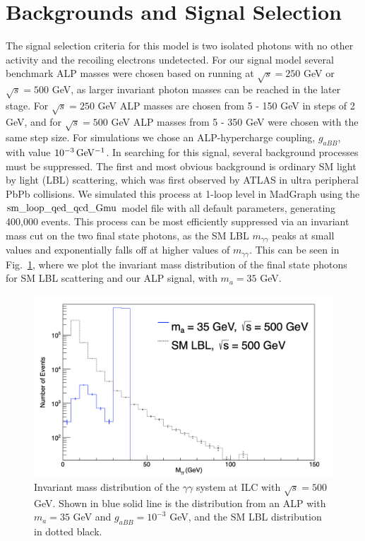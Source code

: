 \documentclass[aps,onecolumn,twoside,secnumarabic,12pt,balancelastpage,amsmath,amssymb,nofootinbib,hyperref=pdftex]{revtex4}
\begin{document}
\section{Backgrounds and Signal Selection}
The signal selection criteria for this model is two isolated photons with no other activity and the recoiling electrons undetected. For our signal model several benchmark ALP masses were chosen based on running at $\sqrt{s} = 250$ GeV or $\sqrt{s} = 500$ GeV, as larger invariant photon masses can be reached in the later stage. For $\sqrt{s} = 250$ GeV ALP masses are chosen from 5 - 150 GeV in steps of 2 GeV, and for $\sqrt{s} = 500$ GeV ALP masses from 5 - 350 GeV were chosen with the same step size. 
\vskip 0.12in
For simulations we chose an ALP-hypercharge coupling, $g_{aBB}$, with value $10^{-3}\,\rm{GeV^{-1}}$. In searching for this signal, several background processes must be suppressed. The first and most obvious background is ordinary SM light by light (LBL) scattering, which was first observed by ATLAS in ultra peripheral PbPb collisions\cite{LBL}. We simulated this process at 1-loop level in MadGraph using the $\rm{sm\_loop\_qed\_qcd\_Gmu}$ model file with all default parameters, generating 400,000 events\cite{Hirschi:2015iia}. This process can be most efficiently suppressed via an invariant mass cut on the two final state photons, as the SM LBL $m_{\gamma\gamma}$ peaks at small values and exponentially falls off at higher values of $m_{\gamma\gamma}$. This can be seen in Fig.~\ref{fig:minv}, where we plot the invariant mass distribution of the final state photons for SM LBL scattering and our ALP signal, with $m_{a} = 35$ GeV. 
\begin{figure}[t]
\begin{center}
\includegraphics[width=13cm]{minv.png}
\caption{Invariant mass distribution of the $\gamma\gamma$ system at ILC with $\sqrt{s} = 500$ GeV. Shown in blue solid line is the distribution from an ALP with $m_{a} = 35$ GeV and $g_{aBB} = 10^{-3}$ GeV, and the SM LBL distribution in dotted black.}
\label{fig:minv}
\end{center}
\end{figure}
\end{document}
